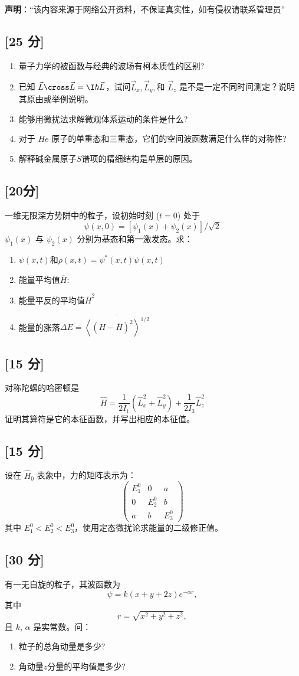 
\textbf{声明}：“该内容来源于网络公开资料，不保证真实性，如有侵权请联系管理员”

\subsection{[25 分]}
\begin{enumerate}
\item 量子力学的被函数与经典的波场有柯本质性的区别?
\item 已知 $\vec L \cross \vec L = \I \hbar \vec L$，试问$\vec L_x, \vec L_y,$和 $\vec L_z$ 是不是一定不同时间测定？说明其原由或举例说明。
\item 能够用微扰法求解微观体系运动的条件是什么?
\item 对于 $He$ 原子的单重态和三重态，它们的空间波函数满足什么样的对称性?
\item 解释碱金属原子$S$谱项的精细结构是单层的原因。
\end{enumerate}
\subsection{[20分]}
一维无限深方势阱中的粒子，设初始时刻 ($t = 0$) 处于
\[
\psi(x, 0) = [\psi_1(x) + \psi_2(x)]/\sqrt{2}~
\]
$\psi_1(x)$ 与 $\psi_2(x)$ 分别为基态和第一激发态。求：
\begin{enumerate}
\item $\psi(x, t)$和$\rho(x,t) = \psi^*(x,t)\psi(x,t)$
\item 能量平均值$\overline{H} $:
\item 能量平反的平均值$\overline{H}^2 $
\item 能量的涨落$\Delta E =\overline{\left\langle \left( H - \overline{H} \right)^2\right\rangle^{1/2}}$
\end{enumerate}
\subsection{[15 分]}
对称陀螺的哈密顿是\[\hat{H} = \frac{1}{2I_1} \left( \hat{L}_x^2 + \hat{L}_y^2 \right) + \frac{1}{2I_3} \hat{L}_z^2~\]
证明其算符是它的本征函数，并写出相应的本征值。
\subsection{[15 分]}
设在 $\hat H_0$ 表象中，力的矩阵表示为：
\[
\begin{pmatrix}
E_1^0 & 0 & a \\
0 & E_2^0 & b \\
a^. & b & E_3^0
\end{pmatrix}~
\]
其中 $E_1^0 < E_2^0 < E_3^0$，使用定态微扰论求能量的二级修正值。
\subsection{[30 分]}
有一无自旋的粒子，其波函数为
\[
\psi = k(x + y + 2z)e^{-\alpha r},~
\]
其中
\[
r = \sqrt{x^2 + y^2 + z^2},~
\]
且 $k$, $\alpha$ 是实常数。问：
\begin{enumerate}
\item 粒子的总角动量是多少?
\item 角动量$z$分量的平均值是多少?
\end{enumerate}
